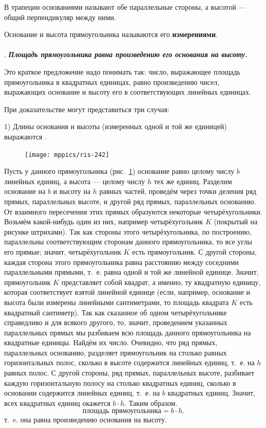 \documentclass[oneside]{book}
\begin{document}
В трапеции основаниями называют обе параллельные стороны, а высотой — общий перпендикуляр между ними.

Основание и высота прямоугольника называются его \textbf{измерениями}.

\paragraph{}\label{1938/246}
.
\textbf{\emph{Площадь прямоугольника равна произведению его основания на высоту.}}

Это краткое предложение надо понимать так:
число, выражающее площадь прямоугольника в квадратных единицах, равно произведению чисел, выражающих основание и высоту его в соответствующих линейных единицах.


При доказательстве могут представиться три случая:


1) Длины основания и высоты (измеренных одной и той же единицей) выражаются .

\begin{figure}
\centering
\texttt{[image: mppics/ris-242]}
\caption{}\label{1938/ris-242}
\end{figure}

Пусть у данного прямоугольника (рис.~\ref{1938/ris-242}) основание равно целому числу $b$ линейных единиц, а высота — целому числу $h$ тех же единиц.
Разделим основание на $b$ и высоту на $h$ равных частей, проведём через точки деления ряд прямых, параллельных высоте, и другой ряд прямых, параллельных основанию.
От взаимного пересечения этих прямых образуются некоторые четырёхугольники.
Возьмём какой-нибудь один из них, например четырёхугольник $K$ (покрытый на рисунке штрихами).
Так как стороны этого четырёхугольника, по построению, параллельны соответствующим сторонам данного прямоугольника, то все углы его прямые;
значит, четырёхугольник $K$ есть прямоугольник.
С другой стороны, каждая сторона этого прямоугольника равна расстоянию между соседними параллельными прямыми, т.~е. равна одной и той же линейной единице. %
Значит, прямоугольник $K$ представляет собой квадрат, а именно, ту квадратную единицу, которая соответствует взятой линейной единице (если, например, основание и высота были измерены линейными сантиметрами, то площадь квадрата $K$ есть квадратный сантиметр).
Так как сказанное об одном четырёхугольнике справедливо и для всякого другого, то, значит, проведением указанных параллельных прямых мы разбиваем всю площадь данного прямоугольника на квадратные единицы.
Найдём их число.
Очевидно, что ряд прямых, параллельных основанию, разделяет прямоугольник на столько равных горизонтальных полос, сколько в высоте содержится линейных единиц, т.~е. на $h$ равных полос.
С другой стороны, ряд прямых, параллельных высоте, разбивает каждую горизонтальную полосу на столько квадратных единиц, сколько в основании содержится линейных единиц, т.~е. на $b$ квадратных единиц.
Значит, всех квадратных единиц окажется $b\cdot h$.
Таким образом.
\[\text{площадь прямоугольника} = b\cdot h.\]
т.~e. она равна произведению основания на высоту.
\end{document}
